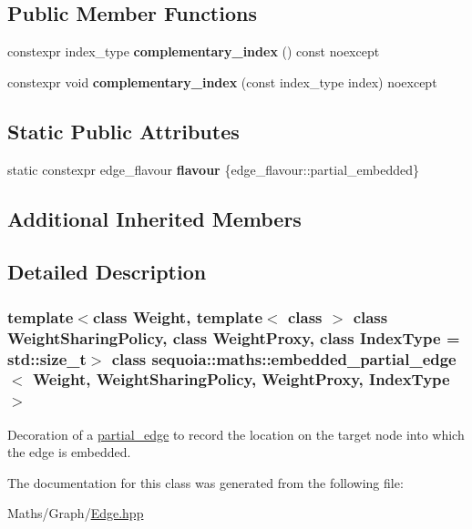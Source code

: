 \subsection*{Public Member Functions}
\begin{DoxyCompactItemize}
\item 
\mbox{\label{classsequoia_1_1maths_1_1embedded__partial__edge_a088db686b910524dbc08712c91ac0f7a}} 
constexpr index\+\_\+type {\bfseries complementary\+\_\+index} () const noexcept
\item 
\mbox{\label{classsequoia_1_1maths_1_1embedded__partial__edge_a6d3c5ff0928095d9f5e324b1aec48097}} 
constexpr void {\bfseries complementary\+\_\+index} (const index\+\_\+type index) noexcept
\end{DoxyCompactItemize}
\subsection*{Static Public Attributes}
\begin{DoxyCompactItemize}
\item 
\mbox{\label{classsequoia_1_1maths_1_1embedded__partial__edge_a6916842b687d9142d0aeb060b48cefd0}} 
static constexpr edge\+\_\+flavour {\bfseries flavour} \{edge\+\_\+flavour\+::partial\+\_\+embedded\}
\end{DoxyCompactItemize}
\subsection*{Additional Inherited Members}


\subsection{Detailed Description}
\subsubsection*{template$<$class Weight, template$<$ class $>$ class Weight\+Sharing\+Policy, class Weight\+Proxy, class Index\+Type = std\+::size\+\_\+t$>$\newline
class sequoia\+::maths\+::embedded\+\_\+partial\+\_\+edge$<$ Weight, Weight\+Sharing\+Policy, Weight\+Proxy, Index\+Type $>$}

Decoration of a \mbox{\hyperlink{classsequoia_1_1maths_1_1partial__edge}{partial\+\_\+edge}} to record the location on the target node into which the edge is embedded. 

The documentation for this class was generated from the following file\+:\begin{DoxyCompactItemize}
\item 
Maths/\+Graph/\mbox{\hyperlink{_edge_8hpp}{Edge.\+hpp}}\end{DoxyCompactItemize}
